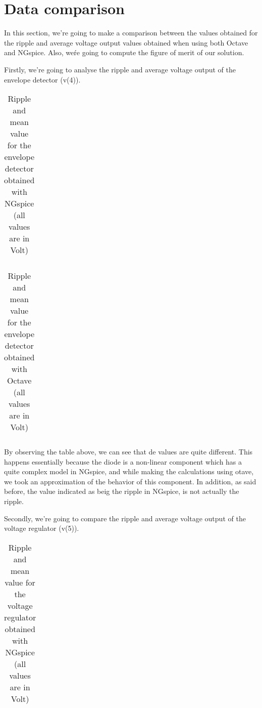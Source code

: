 \section{Data comparison}
\label{sec:comparison}

\par In this section, we're going to make a comparison between the values obtained for the ripple and average voltage output values obtained when using both Octave and NGspice. Also, weŕe going to compute the figure of merit of our solution.
\par Firstly, we're going to analyse the ripple and average voltage output of the envelope detector (v(4)).

\vspace{5mm}
\begin{table}[H]
\centering
\begin{tabularx}{0.9\textwidth} {
  | >{\raggedright\arraybackslash}X
  | >{\raggedleft\arraybackslash}X | }
 \hline

\end{tabularx}
\caption{\label{tab:Table 6} Ripple and mean value for the envelope detector obtained with NGspice (all values are in Volt)}
\end{table}
\vspace{5mm}

\begin{table}[H]
\centering
\begin{tabularx}{0.9\textwidth} {
  | >{\raggedright\arraybackslash}X
  | >{\raggedleft\arraybackslash}X | }
 \hline

\end{tabularx}
\caption{\label{tab:Table 7} Ripple and mean value for the envelope detector obtained with Octave (all values are in Volt)}
\end{table}
\vspace{5mm}

\par By observing the table above, we can see that de values are quite different. This happens essentially because the diode is a non-linear component which has a quite complex model in NGspice, and while making the calculations using otave, we took an approximation of the behavior of this component. In addition, as said before, the value indicated as beig the ripple in NGspice, is not actually the ripple.
\par Secondly, we're going to compare the ripple and average voltage output of the voltage regulator (v(5)).

\vspace{5mm}
\begin{table}[H]
\centering
\begin{tabularx}{0.9\textwidth} {
  | >{\raggedright\arraybackslash}X
  | >{\raggedleft\arraybackslash}X | }
 \hline

\end{tabularx}
\caption{\label{tab:Table 8} Ripple and mean value for the voltage regulator obtained with NGspice (all values are in Volt)}
\end{table}
\vspace{5mm}

